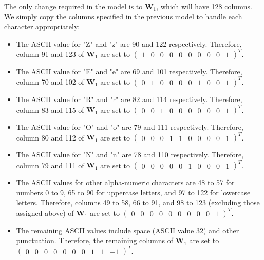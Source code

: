 \documentclass{somasmsc}
\begin{document}
The only change required in the model is to $\mathbf{W}_1$, which will have 128 columns. We simply copy the columns specified in the previous model to handle each character appropriately:
\begin{itemize}
    \item The ASCII value for "Z" and "z" are 90 and 122 respectively. Therefore, column 91 and 123 of $\mathbf{W}_1$ are set to $\begin{pmatrix}
        1 & 0 & 0 & 0 & 0 & 0 & 0 & 0 & 0 & 1
    \end{pmatrix}^T$.
    \item The ASCII value for "E" and "e" are 69 and 101 respectively. Therefore, column 70 and 102 of $\mathbf{W}_1$ are set to $\begin{pmatrix}
        0 & 1 & 0 & 0 & 0 & 0 & 1 & 0 & 0 & 1
    \end{pmatrix}^T$.
    \item The ASCII value for "R" and "r" are 82 and 114 respectively. Therefore, column 83 and 115 of $\mathbf{W}_1$ are set to $\begin{pmatrix}
        0 & 0 & 1 & 0 & 0 & 0 & 0 & 0 & 0 & 1
    \end{pmatrix}^T$.
    \item The ASCII value for "O" and "o" are 79 and 111 respectively. Therefore, column 80 and 112 of $\mathbf{W}_1$ are set to $\begin{pmatrix}
        0 & 0 & 0 & 1 & 1 & 0 & 0 & 0 & 0 & 1
    \end{pmatrix}^T$.
    \item The ASCII value for "N" and "n" are 78 and 110 respectively. Therefore, column 79 and 111 of $\mathbf{W}_1$ are set to $\begin{pmatrix}
        0 & 0 & 0 & 0 & 0 & 1 & 0 & 0 & 0 & 1
    \end{pmatrix}^T$.
    \item The ASCII values for other alpha-numeric characters are 48 to 57 for numbers 0 to 9, 65 to 90 for uppercase letters, and 97 to 122 for lowercase letters. Therefore, columns 49 to 58, 66 to 91, and 98 to 123 (excluding those assigned above) of $\mathbf{W}_1$ are set to $\begin{pmatrix}
        0 & 0 & 0 & 0 & 0 & 0 & 0 & 0 & 0 & 1
    \end{pmatrix}^T$.
    \item The remaining ASCII values include space (ASCII value 32) and other punctuation. Therefore, the remaining columns of $\mathbf{W}_1$ are set to \\ $\begin{pmatrix}
        0 & 0 & 0 & 0 & 0 & 0 & 0 & 1 & 1 & -1
    \end{pmatrix}^T$.
\end{itemize}
\end{document}
